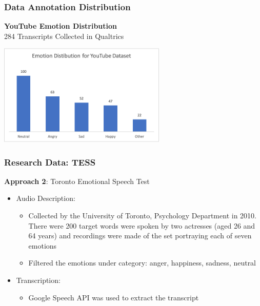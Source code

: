 \documentclass{beamer}
\begin{document}
\begin{frame}
\frametitle{Data Annotation Distribution}


\textbf{YouTube Emotion Distribution}
\\
284 Transcripts Collected in Qualtrics

\begin{center}
    \includegraphics[width=8cm]{images/emo_yt.png}
\end{center}
\end{frame}




\begin{frame}
\frametitle{Research Data: TESS}
\textbf{Approach 2}: Toronto Emotional Speech Test
\begin{itemize}
\item Audio Description:
    \begin{itemize}
    	 \item	Collected by the University of Toronto, Psychology Department in 2010. There were 200 target words were spoken by two actresses (aged 26 and 64 years) and recordings were made of the set portraying each of seven emotions
    	 \item	Filtered the emotions under category: anger, happiness, sadness, neutral
    \end{itemize}
\item Transcription:
    \begin{itemize}
    	 \item	Google Speech API was used to extract the transcript
    \end{itemize}
\end{itemize}
\end{frame}
\end{document}
